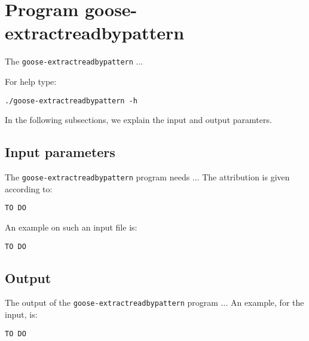 \section{Program goose-extractreadbypattern}
The \texttt{goose-extractreadbypattern} ...

For help type:
\begin{lstlisting}
./goose-extractreadbypattern -h
\end{lstlisting}
In the following subsections, we explain the input and output paramters.

\subsection*{Input parameters}

The \texttt{goose-extractreadbypattern} program needs ...
The attribution is given according to:
\begin{lstlisting}
TO DO
\end{lstlisting}

An example on such an input file is:
\begin{lstlisting}
TO DO
\end{lstlisting}

\subsection*{Output}
The output of the \texttt{goose-extractreadbypattern} program ...
An example, for the input, is:
\begin{lstlisting}
TO DO
\end{lstlisting}
